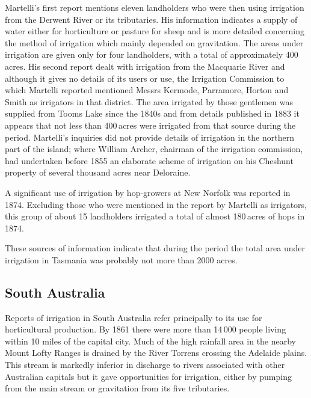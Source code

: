 Martelli's first report mentions eleven landholders who were then
using irrigation from the Derwent River or its tributaries.  His
information indicates a supply of water either for horticulture or
pasture for sheep and is more detailed
concerning the method of irrigation which mainly depended on
gravitation.  The areas under irrigation are given only for four
landholders, with a total of approximately 400\,acres.  His second
report dealt with irrigation from the Macquarie River and although it
gives no details of its users or use, the Irrigation Commission to
which Martelli reported mentioned Messrs Kermode, Parramore, Horton
and Smith as irrigators in that district.  The area irrigated by those
gentlemen was supplied from Tooms Lake  since the
1840s and from details published in 1883 it appears that not less than
400\,acres were irrigated from that source during the period.
Martelli's inquiries did not provide details of irrigation in the
northern part of the island; where William Archer, 
chairman of the irrigation commission, had undertaken before 1855 an
elaborate scheme of irrigation on his Cheshunt property of several
thousand acres near Deloraine.

A significant use of irrigation by hop-growers  at New
Norfolk was reported in 1874.  Excluding those who were mentioned in
the report by Martelli as irrigators, this group of about 15
landholders irrigated a total of almost 180\,acres of hops in
1874.

These sources of information indicate that during the period the total
area under irrigation in Tasmania was probably not more than 2000
acres.

\subsection*{South Australia}

Reports of irrigation in South Australia  refer
principally to its use for horticultural production.  By 1861 there
were more than 14\,000 people living within 10 miles of the capital
city.  Much of the high rainfall area in the nearby Mount Lofty Ranges
is drained by the River Torrens  crossing the
Adelaide  plains.  This stream is markedly
inferior in discharge to rivers associated with other Australian
capitals but it gave opportunities for irrigation, either by pumping
from the main stream or gravitation from its five
tributaries.

